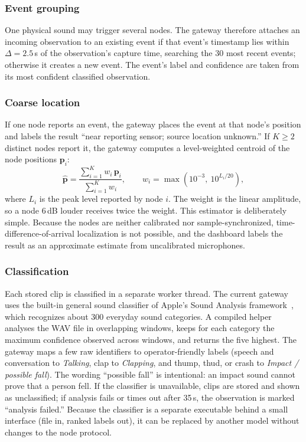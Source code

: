 \documentclass[conference]{IEEEtran}
\begin{document}
\subsubsection{Event grouping}
One physical sound may trigger several nodes. The gateway therefore attaches an incoming observation to an existing event if that event's timestamp lies within $\Delta = 2.5$\,s of the observation's capture time, searching the 30 most recent events; otherwise it creates a new event. The event's label and confidence are taken from its most confident classified observation.

\subsubsection{Coarse location}
If one node reports an event, the gateway places the event at that node's position and labels the result ``near reporting sensor; source location unknown.'' If $K \geq 2$ distinct nodes report it, the gateway computes a level-weighted centroid of the node positions $\mathbf{p}_i$:
\begin{equation}
\hat{\mathbf{p}} = \frac{\sum_{i=1}^{K} w_i\, \mathbf{p}_i}{\sum_{i=1}^{K} w_i}, \qquad w_i = \max\!\left(10^{-3},\ 10^{L_i/20}\right),
\label{eq:centroid}
\end{equation}
where $L_i$ is the peak level reported by node $i$. The weight is the linear amplitude, so a node 6\,dB louder receives twice the weight. This estimator is deliberately simple. Because the nodes are neither calibrated nor sample-synchronized, time-difference-of-arrival localization is not possible, and the dashboard labels the result as an approximate estimate from uncalibrated microphones.

\subsubsection{Classification}
Each stored clip is classified in a separate worker thread. The current gateway uses the built-in general sound classifier of Apple's Sound Analysis framework~\cite{applesa}, which recognizes about 300 everyday sound categories. A compiled helper analyses the WAV file in overlapping windows, keeps for each category the maximum confidence observed across windows, and returns the five highest. The gateway maps a few raw identifiers to operator-friendly labels (speech and conversation to \emph{Talking}, clap to \emph{Clapping}, and thump, thud, or crash to \emph{Impact / possible fall}). The wording ``possible fall'' is intentional: an impact sound cannot prove that a person fell. If the classifier is unavailable, clips are stored and shown as unclassified; if analysis fails or times out after 35\,s, the observation is marked ``analysis failed.'' Because the classifier is a separate executable behind a small interface (file in, ranked labels out), it can be replaced by another model without changes to the node protocol.
\end{document}
